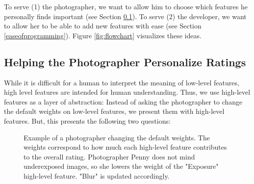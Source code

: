 \documentclass[11pt,letter]{article}
\begin{document}
To serve (1) the photographer, we want to allow him to choose which features he personally finds important (see Section \ref{abstraction}). To serve (2) the developer, we want to allow her to be able to add new features with ease (see Section \ref{easeofprogramming}). Figure \ref{fig:flowchart} visualizes these ideas.

\begin{figure*}[b!]
  \centering
  \caption{An example flowchart. Here, the application computes three low-level features. All three combine to rate the two high-level features: blurriness and exposure. The developer controls which features are present. The photographer's personal preferences can change the default weights on high-level features.}
  \label{fig:flowchart}
\end{figure*}

\subsection{Helping the Photographer Personalize Ratings}
\label{abstraction}
While it is difficult for a human to interpret the meaning of low-level features, high level features are intended for human understanding. Thus, we use high-level features as a layer of abstraction: Instead of asking the photographer to change the default weights on low-level features, we present them with high-level features. But, this presents the following two questions:


\begin{figure}
\centering
{}
\caption{Example of a photographer changing the default weights. The weights correspond to how much each high-level feature contributes to the overall rating. Photographer Penny does not mind underexposed images, so she lowers the weight of the "Exposure" high-level feature. "Blur" is updated accordingly.}
\label{fig:weighttable}
\end{figure}
\end{document}
